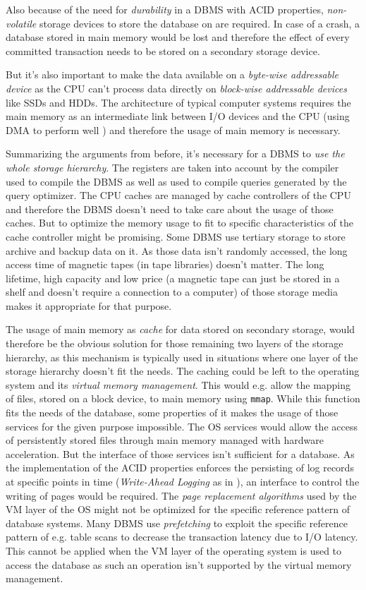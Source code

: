     Also because of the need for \emph{durability} in a DBMS with ACID properties, \emph{non-volatile} storage devices to store the database on are required. In case of a crash, a database stored in main memory would be lost and therefore the effect of every committed transaction needs to be stored on a secondary storage device.

    But it's also important to make the data available on a \emph{byte-wise addressable device} as the CPU can't process data directly on \emph{block-wise addressable devices} like SSDs and HDDs. The architecture of typical computer systems requires the main memory as an intermediate link between I/O devices and the CPU (using DMA to perform well \cite{Stallings:2013}) and therefore the usage of main memory is necessary.

    Summarizing the arguments from before, it's necessary for a DBMS to \emph{use the whole storage hierarchy}. The registers are taken into account by the compiler used to compile the DBMS as well as used to compile queries generated by the query optimizer. The CPU caches are managed by cache controllers of the CPU and therefore the DBMS doesn't need to take care about the usage of those caches. But to optimize the memory usage to fit to specific characteristics of the cache controller might be promising. Some DBMS use tertiary storage to store archive and backup data on it. As those data isn't randomly accessed, the long access time of magnetic tapes (in tape libraries) doesn't matter. The long lifetime, high capacity and low price (a magnetic tape can just be stored in a shelf and doesn't require a connection to a computer) of those storage media makes it appropriate for that purpose.

    The usage of main memory as \emph{cache} for data stored on secondary storage, would therefore be the obvious solution for those remaining two layers of the storage hierarchy, as this mechanism is typically used in situations where one layer of the storage hierarchy doesn't fit the needs. The caching could be left to the operating system and its \emph{virtual memory management}. This would e.g. allow the mapping of files, stored on a block device, to main memory using \lstinline{mmap}. While this function fits the needs of the database, some properties of it makes the usage of those services for the given purpose impossible. The OS services would allow the access of persistently stored files through main memory managed with hardware acceleration. But the interface of those services isn't sufficient for a database. As the implementation of the ACID properties enforces the persisting of log records at specific points in time (\emph{Write-Ahead Logging} as in \cite{Mohan:1992}), an interface to control the writing of pages would be required. The \emph{page replacement algorithms} used by the VM layer of the OS might not be optimized for the specific reference pattern of database systems. Many DBMS use \emph{prefetching} to exploit the specific reference pattern of e.g. table scans to decrease the transaction latency due to I/O latency. This cannot be applied when the VM layer of the operating system is used to access the database as such an operation isn't supported by the virtual memory management.

